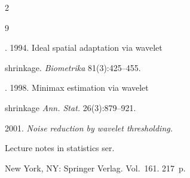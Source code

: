 
 




















  \begin{multicols}{2}



\renewcommand{\bibname}{\protect\rmfamily References}




{\small\frenchspacing

 {%


 \begin{thebibliography}{9}








. 1994. Ideal spatial adaptation via wavelet 

shrinkage. \textit{Biometrika} 81(3):425--455.




. 1998. Minimax estimation via wavelet

 shrinkage \textit{Ann. Stat.}  26(3):879--921.




 2001. \textit{Noise reduction by wavelet thresholding.} 

Lecture notes in statistics ser.

New York, NY: Springer Verlag.  Vol.~161. 217~p.




\end{thebibliography}}}
\end{multicols}

